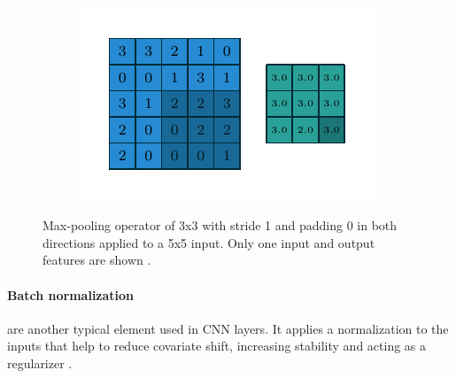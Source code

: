 \begin{figure}[!ht]
\begin{subfigure}{0.2\textwidth}
	\end{subfigure}
	~ %
	\begin{subfigure}{0.2\textwidth}
		\includegraphics[scale=0.5]{Figures/chapter_background/max_pooling/numerical_max_pooling_08.pdf}
	\end{subfigure}
	\caption[Max-pooling operator of 3x3, stride 1, padding 0]{Max-pooling operator of 3x3 with stride 1 and padding 0 in both directions applied to a 5x5 input. Only one input and output features are shown \citep{dumoulin2016guide}.}
	\label{back:fig:pooling_operator}
\end{figure}

\paragraph{Batch normalization} are another typical element used in CNN layers. It applies a normalization to the inputs that help to reduce covariate shift, increasing stability and acting as a regularizer \citep{batch-norm}.

